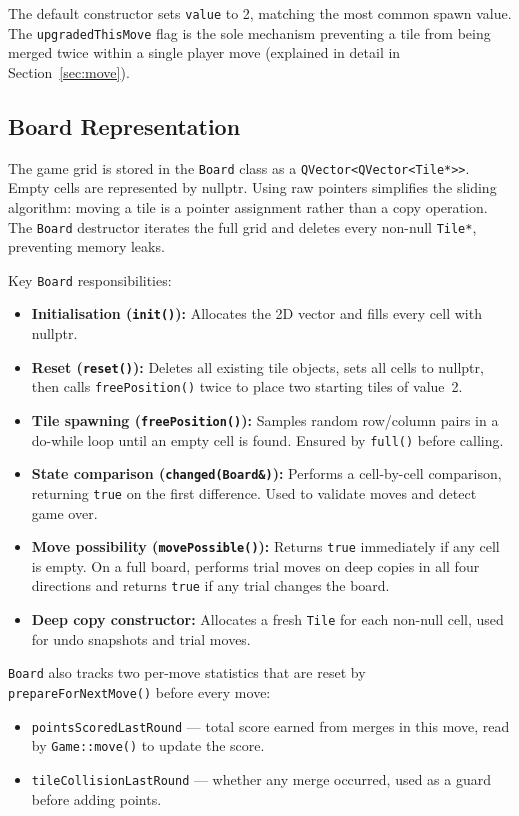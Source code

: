 \documentclass[a4paper,12pt]{article}
\begin{document}
The default constructor sets \texttt{value} to 2, matching the most common spawn value. The \texttt{upgradedThisMove} flag is the sole mechanism preventing a tile from being merged twice within a single player move (explained in detail in Section~\ref{sec:move}).

\subsection{Board Representation}

The game grid is stored in the \texttt{Board} class as a \texttt{QVector<QVector<Tile*>>}. Empty cells are represented by nullptr. Using raw pointers simplifies the sliding algorithm: moving a tile is a pointer assignment rather than a copy operation. The \texttt{Board} destructor iterates the full grid and deletes every non-null \texttt{Tile*}, preventing memory leaks.

Key \texttt{Board} responsibilities:

\begin{itemize}
    \item \textbf{Initialisation (\texttt{init()}):} Allocates the 2D vector and fills every cell with nullptr.
    \item \textbf{Reset (\texttt{reset()}):} Deletes all existing tile objects, sets all cells to nullptr, then calls \texttt{freePosition()} twice to place two starting tiles of value~2.
    \item \textbf{Tile spawning (\texttt{freePosition()}):} Samples random row/column pairs in a do-while loop until an empty cell is found. Ensured by \texttt{full()} before calling.
    \item \textbf{State comparison (\texttt{changed(Board\&)}):} Performs a cell-by-cell comparison, returning \texttt{true} on the first difference. Used to validate moves and detect game over.
    \item \textbf{Move possibility (\texttt{movePossible()}):} Returns \texttt{true} immediately if any cell is empty. On a full board, performs trial moves on deep copies in all four directions and returns \texttt{true} if any trial changes the board.
    \item \textbf{Deep copy constructor:} Allocates a fresh \texttt{Tile} for each non-null cell, used for undo snapshots and trial moves.
\end{itemize}

\texttt{Board} also tracks two per-move statistics that are reset by \texttt{prepareForNextMove()} before every move:
\begin{itemize}
    \item \texttt{pointsScoredLastRound} --- total score earned from merges in this move, read by \texttt{Game::move()} to update the score.
    \item \texttt{tileCollisionLastRound} --- whether any merge occurred, used as a guard before adding points.
\end{itemize}
\end{document}
